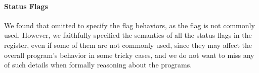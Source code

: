 


%
%



\paragraph{Status Flags}

We found that \Strata omitted to specify the  flag behaviors, as the flag is not commonly used.
However, we faithfully specified the semantics of all the status flags in the  register, even if some of them are not commonly used, since they may affect the overall program's behavior in some tricky cases, and we do not want to miss any of such details when formally reasoning about the \ISA programs.





